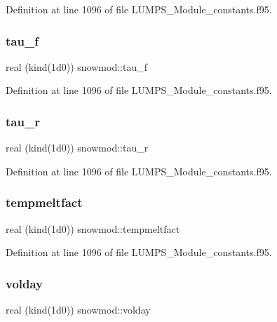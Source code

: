 Definition at line 1096 of file L\+U\+M\+P\+S\+\_\+\+Module\+\_\+constants.\+f95.

\mbox{\label{namespacesnowmod_adcf5755398c1385d35ef29e6f780ff9c}} 
\subsubsection{\texorpdfstring{tau\+\_\+f}{tau\_f}}
{\footnotesize\ttfamily real (kind(1d0)) snowmod\+::tau\+\_\+f}



Definition at line 1096 of file L\+U\+M\+P\+S\+\_\+\+Module\+\_\+constants.\+f95.

\mbox{\label{namespacesnowmod_aaf08f7c00b0d87b2135341ca3f63f0d7}} 
\subsubsection{\texorpdfstring{tau\+\_\+r}{tau\_r}}
{\footnotesize\ttfamily real (kind(1d0)) snowmod\+::tau\+\_\+r}



Definition at line 1096 of file L\+U\+M\+P\+S\+\_\+\+Module\+\_\+constants.\+f95.

\mbox{\label{namespacesnowmod_a963e4ef23aef666f3afb12096ef952b8}} 
\subsubsection{\texorpdfstring{tempmeltfact}{tempmeltfact}}
{\footnotesize\ttfamily real (kind(1d0)) snowmod\+::tempmeltfact}



Definition at line 1096 of file L\+U\+M\+P\+S\+\_\+\+Module\+\_\+constants.\+f95.

\mbox{\label{namespacesnowmod_aef00a57fa640ad627fb60de11644e20d}} 
\subsubsection{\texorpdfstring{volday}{volday}}
{\footnotesize\ttfamily real (kind(1d0)) snowmod\+::volday}




